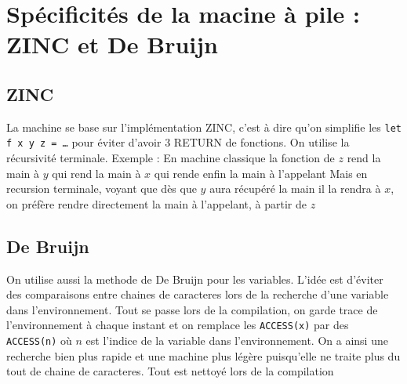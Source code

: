 \documentclass{article}
\begin{document}
\section{Spécificités de la macine à pile : ZINC et De Bruijn}
\subsection{ZINC}
La machine se base sur l’implémentation ZINC, c’est à dire qu’on simplifie les
\texttt{let f x y z = \ldots} pour éviter d’avoir 3 RETURN de fonctions. On utilise
la récursivité terminale.
Exemple : En machine classique la fonction de $z$ rend la main à $y$
qui rend la main à $x$ qui rende enfin la main à l’appelant
Mais en recursion terminale, voyant que dès que $y$
aura récupéré la main il la rendra à $x$, on préfère rendre directement la 
main à l’appelant, à partir de $z$

\subsection{De Bruijn}
On utilise aussi la methode de De Bruijn pour les variables.
L’idée est d’éviter des comparaisons entre chaines de caracteres lors de la
recherche d’une variable dans l’environnement.
Tout se passe lors de la compilation, on garde trace de l’environnement à
chaque instant et on remplace les \texttt{ACCESS(x)} par des
\texttt{ACCESS(n)} où $n$ est l’indice de la variable dans l’environnement.
On a ainsi une recherche bien plus rapide et
une machine plus légère puisqu’elle ne traite plus du tout de chaine de caracteres.
Tout est nettoyé lors de la compilation




\end{document}

